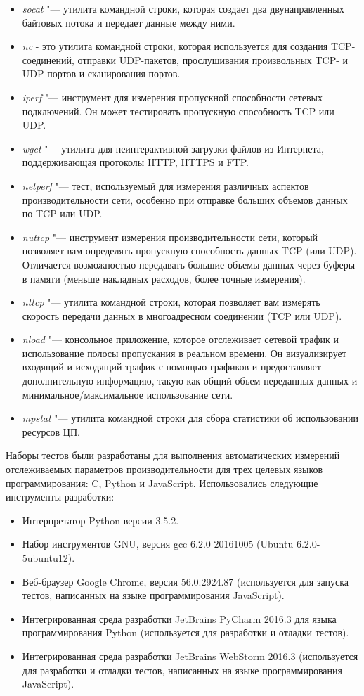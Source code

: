 \begin{itemize}
	\item \textit{socat} "--- утилита командной строки, которая создает два двунаправленных байтовых потока и передает данные между ними.
	\item \textit{nc} - это утилита командной строки, которая используется для создания TCP-соединений, отправки UDP-пакетов, прослушивания произвольных TCP- и UDP-портов и сканирования портов.
	\item \textit{iperf} "--- инструмент для измерения пропускной способности сетевых подключений. Он может тестировать пропускную способность TCP или UDP.
	\item \textit{wget} "--- утилита для неинтерактивной загрузки файлов из Интернета, поддерживающая протоколы HTTP, HTTPS и FTP.
	\item \textit{netperf} "--- тест, используемый для измерения различных аспектов производительности сети, особенно при отправке больших объемов данных по TCP или UDP.
	\item \textit{nuttcp} "--- инструмент измерения производительности сети, который позволяет вам определять пропускную способность данных TCP (или UDP). Отличается возможностью передавать большие объемы данных через буферы в памяти (меньше накладных расходов, более точные измерения).
	\item \textit{nttcp} "--- утилита командной строки, которая позволяет вам измерять скорость передачи данных в многоадресном соединении (TCP или UDP).
	\item \textit{nload} "--- консольное приложение, которое отслеживает сетевой трафик и использование полосы пропускания в реальном времени. Он визуализирует входящий и исходящий трафик с помощью графиков и предоставляет дополнительную информацию, такую ​​как общий объем переданных данных и минимальное/максимальное использование сети.
	\item \textit{mpstat} "--- утилита командной строки для сбора статистики об использовании ресурсов ЦП.
\end{itemize}

Наборы тестов были разработаны для выполнения автоматических измерений отслеживаемых параметров производительности для трех целевых языков программирования: C, Python и JavaScript. Использовались следующие инструменты разработки:

\begin{itemize}
	\item Интерпретатор Python версии 3.5.2.
	\item Набор инструментов GNU, версия gcc 6.2.0 20161005 (Ubuntu 6.2.0-5ubuntu12).
	\item Веб-браузер Google Chrome, версия 56.0.2924.87 (используется для запуска тестов, написанных на языке программирования JavaScript).
	\item Интегрированная среда разработки JetBrains PyCharm 2016.3 для языка программирования Python (используется для разработки и отладки тестов).
	\item Интегрированная среда разработки JetBrains WebStorm 2016.3 (используется для разработки и отладки тестов, написанных на языке программирования JavaScript).
\end{itemize}

